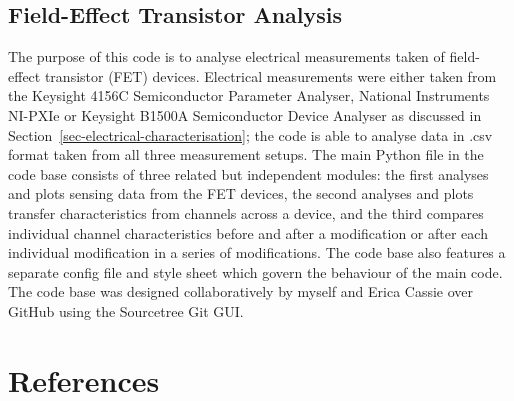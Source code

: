 \documentclass[
  a4paper,
]{scrbook}
\begin{document}
\hypertarget{sec-field-effect-transistor-analysis}{%
\section{Field-Effect Transistor
Analysis}\label{sec-field-effect-transistor-analysis}}

The purpose of this code is to analyse electrical measurements taken of
field-effect transistor (FET) devices. Electrical measurements were
either taken from the Keysight 4156C Semiconductor Parameter Analyser,
National Instruments NI-PXIe or Keysight B1500A Semiconductor Device
Analyser as discussed in Section~\ref{sec-electrical-characterisation};
the code is able to analyse data in .csv format taken from all three
measurement setups. The main Python file in the code base consists of
three related but independent modules: the first analyses and plots
sensing data from the FET devices, the second analyses and plots
transfer characteristics from channels across a device, and the third
compares individual channel characteristics before and after a
modification or after each individual modification in a series of
modifications. The code base also features a separate config file and
style sheet which govern the behaviour of the main code. The code base
was designed collaboratively by myself and Erica Cassie over GitHub
using the Sourcetree Git GUI.

\hypertarget{references}{%
\chapter*{References}\label{references}}


\printbibliography[heading=none]

\newpage{}


\backmatter
\end{document}
